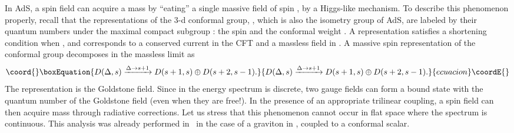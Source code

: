 \documentclass[a4paper,12pt]{article}
\begin{document}
In AdS, a spin \coordHE{} field can acquire a mass by ``eating'' a single
massive field of spin \coordHE{}, by a Higgs-like mechanism.  To describe
this phenomenon properly, recall that the representations of the 3-d
conformal group, \coordHE{}, which is also the isometry group of
AdS\coordHE{}, are labeled by their quantum numbers under the maximal
compact subgroup \coordHE{}: the spin \coordHE{} and the conformal
weight \myHighlight{$\Delta$}\coordHE{}. A representation \coordHE{} satisfies a shortening
condition when \coordHE{}, and corresponds to a conserved current
in the CFT and a massless field in \coordHE{}.  A massive spin \coordHE{}
representation of the conformal group decomposes in the massless limit
as~\cite{he}
\begin{equation}\coord{}\boxEquation{
 D(\Delta,s)\xrightarrow{\Delta\rightarrow s+1} D(s+1,s)\oplus
 D(s+2,s-1) .
}{
 D(\Delta,s)\xrightarrow{\Delta\rightarrow s+1} D(s+1,s)\oplus
 D(s+2,s-1) .
}{ecuacion}\coordE{}\end{equation}
The representation \coordHE{} is the Goldstone field.
Since in \coordHE{} the energy
spectrum is discrete, two gauge fields can form a bound state with
the quantum number of the Goldstone field (even when they are free!). 
In the presence of an appropriate trilinear coupling,
a spin \coordHE{} field can then acquire mass through radiative corrections.
Let us stress that this phenomenon cannot occur in flat space where
the spectrum is continuous.
This analysis was already performed in~\cite{porrati} in the case of a
graviton in \coordHE{}, coupled to a conformal scalar. 
\end{document}
